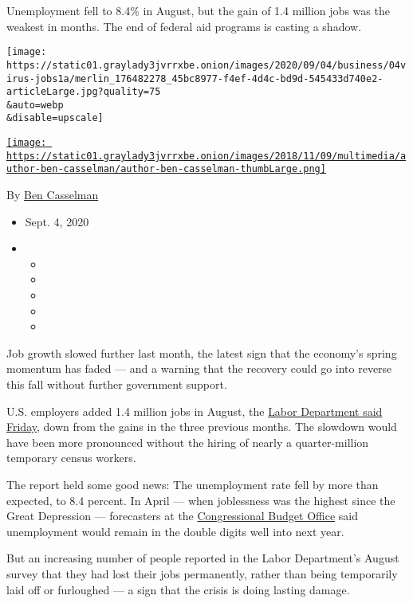 Unemployment fell to 8.4\% in August, but the gain of 1.4 million jobs
was the weakest in months. The end of federal aid programs is casting a
shadow.

\texttt{[image: https://static01.graylady3jvrrxbe.onion/images/2020/09/04/business/04virus-jobs1a/merlin\_176482278\_45bc8977-f4ef-4d4c-bd9d-545433d740e2-articleLarge.jpg?quality=75\\\&auto=webp\\\&disable=upscale]}

\href{https://www.nytimes3xbfgragh.onion/by/ben-casselman}{\texttt{[image: https://static01.graylady3jvrrxbe.onion/images/2018/11/09/multimedia/author-ben-casselman/author-ben-casselman-thumbLarge.png]}}

By \href{https://www.nytimes3xbfgragh.onion/by/ben-casselman}{Ben
Casselman}

\begin{itemize}
\item
  Sept. 4, 2020
\item
  \begin{itemize}
  \item
  \item
  \item
  \item
  \item
  \end{itemize}
\end{itemize}

Job growth slowed further last month, the latest sign that the economy's
spring momentum has faded --- and a warning that the recovery could go
into reverse this fall without further government support.

U.S. employers added 1.4 million jobs in August, the
\href{https://www.bls.gov/news.release/empsit.nr0.htm}{Labor Department
said Friday}, down from the gains in the three previous months. The
slowdown would have been more pronounced without the hiring of nearly a
quarter-million temporary census workers.

The report held some good news: The unemployment rate fell by more than
expected, to 8.4 percent. In April --- when joblessness was the highest
since the Great Depression --- forecasters at the
\href{https://www.cbo.gov/publication/56335}{Congressional Budget
Office} said unemployment would remain in the double digits well into
next year.

But an increasing number of people reported in the Labor Department's
August survey that they had lost their jobs permanently, rather than
being temporarily laid off or furloughed --- a sign that the crisis is
doing lasting damage.

